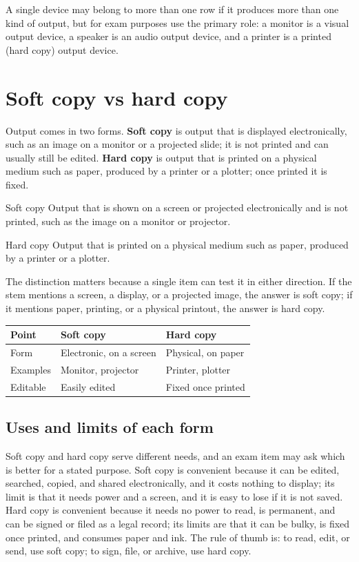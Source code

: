 A single device may belong to more than one row if it produces more than one
kind of output, but for exam purposes use the primary role: a monitor is a
visual output device, a speaker is an audio output device, and a printer is a
printed (hard copy) output device.

\section{Soft copy vs hard copy}
Output comes in two forms. \textbf{Soft copy} is output that is displayed
electronically, such as an image on a monitor or a projected slide; it is not
printed and can usually still be edited. \textbf{Hard copy} is output that is
printed on a physical medium such as paper, produced by a printer or a
plotter; once printed it is fixed.

\begin{definitionbox}{Soft copy}
Output that is shown on a screen or projected electronically and is not
printed, such as the image on a monitor or projector.
\end{definitionbox}

\begin{definitionbox}{Hard copy}
Output that is printed on a physical medium such as paper, produced by a
printer or a plotter.
\end{definitionbox}

The distinction matters because a single item can test it in either
direction. If the stem mentions a screen, a display, or a projected image,
the answer is soft copy; if it mentions paper, printing, or a physical
printout, the answer is hard copy.

\begin{center}
\begin{tabular}{p{}p{}p{}}
\toprule
\textbf{Point} & \textbf{Soft copy} & \textbf{Hard copy} \\
\midrule
Form & Electronic, on a screen & Physical, on paper \\
Examples & Monitor, projector & Printer, plotter \\
Editable & Easily edited & Fixed once printed \\
\bottomrule
\end{tabular}
\end{center}

\subsection{Uses and limits of each form}
Soft copy and hard copy serve different needs, and an exam item may ask which
is better for a stated purpose. Soft copy is convenient because it can be
edited, searched, copied, and shared electronically, and it costs nothing to
display; its limit is that it needs power and a screen, and it is easy to lose
if it is not saved. Hard copy is convenient because it needs no power to read,
is permanent, and can be signed or filed as a legal record; its limits are
that it can be bulky, is fixed once printed, and consumes paper and ink. The
rule of thumb is: to read, edit, or send, use soft copy; to sign, file, or
archive, use hard copy.

